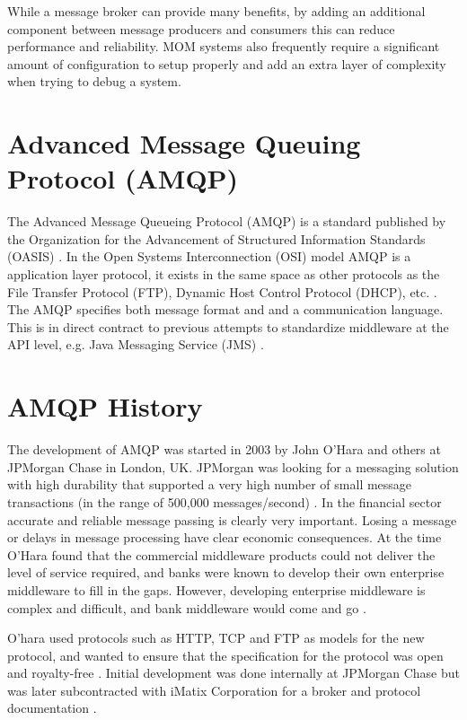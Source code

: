 \documentclass{thesis}
\begin{document}
While a message broker can provide many benefits, by adding an additional component between message producers and consumers this can reduce performance and reliability.  MOM systems also frequently require a significant amount of configuration to setup properly and add an extra layer of complexity when trying to debug a system.
 

\section{Advanced Message Queuing Protocol (AMQP)}
The Advanced Message Queueing Protocol (AMQP) is a standard published by the Organization for the Advancement of Structured Information Standards (OASIS) \cite{OASIS}.  In the Open Systems Interconnection (OSI) model AMQP is a application layer protocol, it exists in the same space as other protocols as the File Transfer Protocol (FTP), Dynamic Host Control Protocol (DHCP), etc.  \cite{WIKI_OSI}.  The AMQP specifies both message format and and a communication language.  This is in direct contract to previous attempts to standardize middleware at the API level, e.g. Java Messaging Service (JMS) \cite{ORACLE_JMS}.

\section{AMQP History}
The development of AMQP was started in 2003 by John O'Hara and others at JPMorgan Chase in London, UK.  JPMorgan was looking for a messaging solution with high durability that supported a very high number of small message transactions (in the range of 500,000 messages/second) \cite{Kramer}.  In the financial sector accurate and reliable message passing is clearly very important.  Losing a message or delays in message processing have clear economic consequences.  At the time O'Hara found that the commercial middleware products could not deliver the level of service required,  and banks were known to develop their own enterprise middleware to fill in the gaps. However, developing enterprise middleware is complex and difficult, and bank middleware would come and go \cite{Kramer}.

O'hara used protocols such as HTTP, TCP and FTP as models for the new protocol, and wanted to ensure that the specification for the protocol was open and royalty-free \cite{O'Hara}.  Initial development was done internally at JPMorgan Chase but was later subcontracted with iMatix Corporation for a broker and protocol documentation \cite{Apps, Cameron}.
\end{document}
